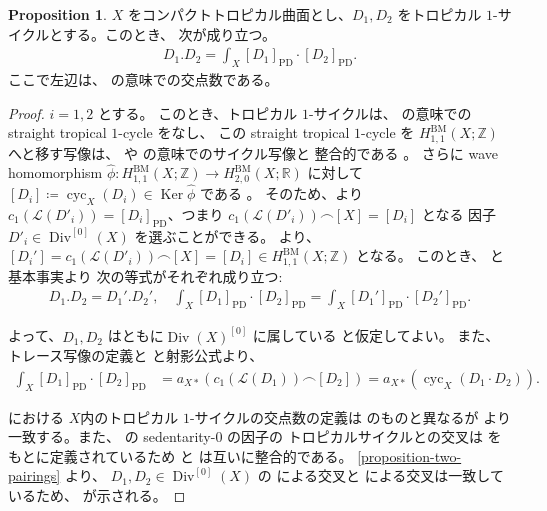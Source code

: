 \documentclass[a4paper,dvipdfmx,reqno,12pt]{amsart}
\theoremstyle{definition}
\newtheorem{proposition}[theorem]{Proposition}
\newcommand{\deq}{\coloneqq}
\newcommand{\opn}[1]{\operatorname{#1}}
\newcommand{\PD}[1]{[#1]_{\mathrm{PD}}}
\numberwithin{equation}{section}
\begin{document}
\begin{proposition}
\label{proposition-cycle-chern}
$X$ をコンパクトトロピカル曲面とし、$D_1,D_2$
をトロピカル $1$-サイクルとする。このとき、
次が成り立つ。
\begin{align}
\label{equation-two-intersections}
D_1 . D_2=\int_X \PD{D_1}\cdot \PD{D_2}.
\end{align}
ここで左辺は、
\cite{shaw2015tropical}
の意味での交点数である。
\end{proposition}
\begin{proof}
$i=1,2$ とする。
このとき、トロピカル $1$-サイクルは、
\cite[Definition 4.2]{MR3330789} の意味での
straight tropical $1$-cycle をなし、
この straight tropical $1$-cycle を
$H_{1,1}^{\mathrm{BM}}(X;\mathbb{Z})$
へと移す写像は、\cite{MR3894860} や
\cite{MR4637248} の意味でのサイクル写像と
整合的である \cite[Theorem 5.13]{MR4637248}。
さらに wave homomorphism 
$\hat{\phi}\colon 
H^{\mathrm{BM}}_{1,1}(X;\mathbb{Z})
\to H^{\mathrm{BM}}_{2,0}(X;\mathbb{R})$ に対して
$[D_i]\deq \opn{cyc}_X(D_i)\in \opn{Ker} \hat{\phi}$
である \cite[Theorem 5.4]{MR3330789}。
そのため、\cite[Lemma 5.13]{MR3894860}より
$c_1(\mathcal{L}(D'_i))=\PD{D_i}$、つまり
$c_1(\mathcal{L}(D'_i))\frown [X]=[D_i]$ となる
因子 $D'_i\in \opn{Div}^{[0]}(X)$ を選ぶことができる。
\cite[Proposition 5.12]{MR4637248}より、
$[D_i']=c_1(\mathcal{L}(D'_i))\frown [X]=[D_i]\in 
H_{1,1}^{\mathrm{BM}}(X;\mathbb{Z})$ 
となる。
このとき、
\cite[Proposition 3.34]{shaw2015tropical} と基本事実より
次の等式がそれぞれ成り立つ:
\begin{align}
D_1.D_2=D_1'.D_2', \quad 
\int_X \PD{D_1}\cdot \PD{D_2}
=\int_X \PD{D_1'}\cdot \PD{D_2'}.
\end{align}

よって、$D_1,D_2$ はともに$\opn{Div}(X)^{[0]}$ に属している
と仮定してよい。
また、トレース写像の定義と
\cite[Proposition 5.12]{MR4637248}と射影公式より、
\begin{align}
\int_X \PD{D_1}\cdot \PD{D_2}
&=a_{X*}(c_1(\mathcal{L}(D_1))\frown [D_2])
=a_{X*}(\opn{cyc}_X(D_1\cdot D_2)).
\end{align}

\cite{shaw2015tropical} における
$X$内のトロピカル
$1$-サイクルの交点数の定義は
\cite{shaw2011tropical} のものと異なるが
\cite[Theorem 3.1.7]{shaw2011tropical}
より一致する。また、
\cite[]{demedrano2023chern}
の sedentarity-$0$ の因子の
トロピカルサイクルとの交叉は \cite{shaw2011tropical}
をもとに定義されているため
\cite{demedrano2023chern} と
\cite{shaw2015tropical} は互いに整合的である。
\cref{proposition-two-pairings} より、
$D_1,D_2\in \opn{Div}^{[0]}(X)$ の
\cite{demedrano2023chern} による交叉と
\cite{MR4637248} による交叉は一致しているため、
\cite{equation-two-intersections} が示される。
\end{proof}
\end{document}
